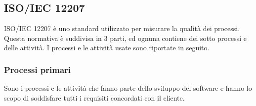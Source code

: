 \subsection{ISO/IEC 12207}
ISO/IEC 12207 è uno standard utilizzato per misurare la qualità dei processi. Questa normativa è suddivisa in 3 parti,
ed ognuna contiene dei sotto processi e delle attività. I processi e le attività usate sono riportate in seguito. 

\subsubsection{Processi primari}
Sono i processi e le attività che fanno parte dello sviluppo del software e hanno lo scopo di soddisfare tutti i requisiti concordati con il cliente.

